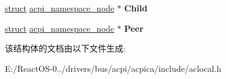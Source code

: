 \begin{DoxyCompactItemize}
\item 
\mbox{\label{structacpi__namespace__node_a0cc0f0f904d0f71a101566af1fc03f55}} 
\hyperlink{interfacestruct}{struct} \hyperlink{structacpi__namespace__node}{acpi\+\_\+namespace\+\_\+node} $\ast$ {\bfseries Child}
\item 
\mbox{\label{structacpi__namespace__node_a7b576609a516e7006e13457a4a28aa0f}} 
\hyperlink{interfacestruct}{struct} \hyperlink{structacpi__namespace__node}{acpi\+\_\+namespace\+\_\+node} $\ast$ {\bfseries Peer}
\end{DoxyCompactItemize}


该结构体的文档由以下文件生成\+:\begin{DoxyCompactItemize}
\item 
E\+:/\+React\+O\+S-\/0../drivers/bus/acpi/acpica/include/aclocal.\+h\end{DoxyCompactItemize}
